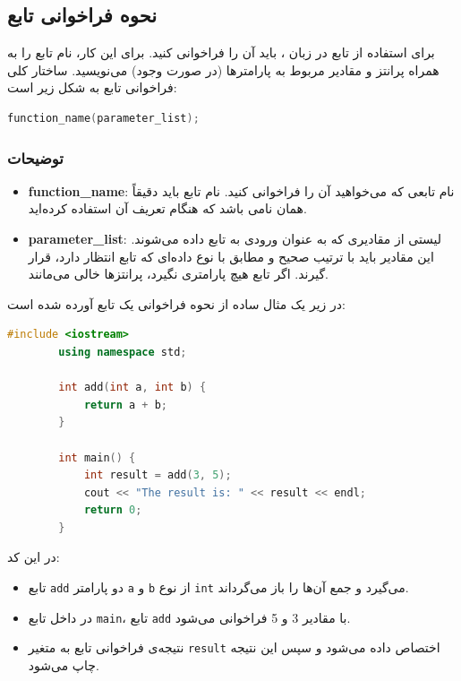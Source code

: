 \documentclass[12pt, a4paper]{report}
\begin{document}
\subsection{نحوه فراخوانی تابع}

برای استفاده از تابع در زبان ، باید آن را فراخوانی کنید. برای این کار، نام تابع را به همراه پرانتز و مقادیر مربوط به پارامترها (در صورت وجود) می‌نویسید. ساختار کلی فراخوانی تابع به شکل زیر است:

\begin{LTR} %
	\begin{lstlisting}[language=C++, breaklines=true]
		function_name(parameter_list);
	\end{lstlisting}
\end{LTR}

\subsubsection{توضیحات}

\begin{itemize}
	\item \textbf{function\_name}: نام تابعی که می‌خواهید آن را فراخوانی کنید. نام تابع باید دقیقاً همان نامی باشد که هنگام تعریف آن استفاده کرده‌اید.
	\item \textbf{parameter\_list}: لیستی از مقادیری که به عنوان ورودی به تابع داده می‌شوند. این مقادیر باید با ترتیب صحیح و مطابق با نوع داده‌ای که تابع انتظار دارد، قرار گیرند. اگر تابع هیچ پارامتری نگیرد، پرانتزها خالی می‌مانند.
\end{itemize}

در زیر یک مثال ساده از نحوه فراخوانی یک تابع آورده شده است:

\begin{LTR} %
	\begin{lstlisting}[language=C++, breaklines=true]
		#include <iostream>
		using namespace std;
		
		int add(int a, int b) {
			return a + b;
		}
		
		int main() {
			int result = add(3, 5);
			cout << "The result is: " << result << endl;
			return 0;
		}
	\end{lstlisting}
\end{LTR}

در این کد:
\begin{itemize}
	\item تابع \texttt{add} دو پارامتر \texttt{a} و \texttt{b} از نوع \texttt{int} می‌گیرد و جمع آن‌ها را باز می‌گرداند.
	\item در داخل تابع \texttt{main}، تابع \texttt{add} با مقادیر 3 و 5 فراخوانی می‌شود.
	\item نتیجه‌ی فراخوانی تابع به متغیر \texttt{result} اختصاص داده می‌شود و سپس این نتیجه چاپ می‌شود.
\end{itemize}
\end{document}
